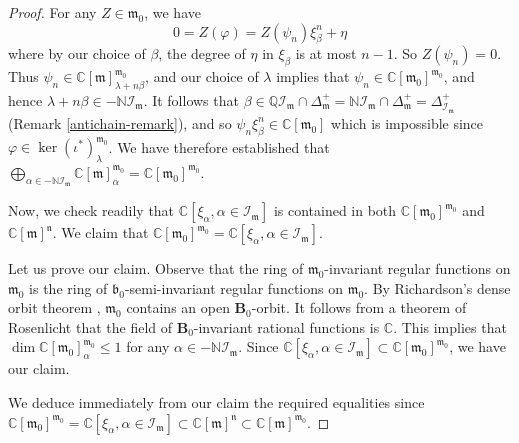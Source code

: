 \documentclass[10pt,a4paper]{amsart}
\newcommand{\soc}[1]{\mathcal{I}_{#1}}
\newcommand{\group}[1]{\mathbf{#1}}
\numberwithin{equation}{section}
\theoremstyle{plain}
\theoremstyle{definition}
\theoremstyle{remark}
\begin{document}
\begin{proof}
For any $Z \in \mathfrak{m}_{0}$, we have
$$
0 = Z ( \varphi )  = Z ( \psi_{n}) \xi_{\beta}^{n} + \eta
$$
where by our choice of $\beta$, the degree of $\eta$ in $\xi_{\beta}$ is at most $n-1$. 
So $Z (\psi_{n} ) = 0$.
Thus $\psi_{n} \in \mathbb{C}[\mathfrak{m}]^{\mathfrak{m}_{0}}_{\lambda + n\beta}$, and our choice
of $\lambda$ implies that $\psi_{n} \in \mathbb{C}[\mathfrak{m}_{0}]^{\mathfrak{m}_{0}}$, and hence
$\lambda + n\beta \in -\mathbb{N}\soc{\mathfrak{m}}$. 
It follows that 
$\beta \in \mathbb{Q} \soc{\mathfrak{m}}\cap \Delta_{\mathfrak{m}}^{+} = 
\mathbb{N}\soc{\mathfrak{m}}\cap \Delta_{\mathfrak{m}}^{+} = \Delta_{\soc{\mathfrak{m}}}^{+}$
(Remark \ref{antichain-remark}), and 
so $\psi_{n}\xi_{\beta}^{n}\in \mathbb{C}[\mathfrak{m}_{0}]$
which is impossible since $\varphi \in \ker (\iota^{*})^{\mathfrak{m}_{0}}_{\lambda}$. 
We have therefore established that
$\bigoplus_{\alpha\in -\mathbb{N}\soc{\mathfrak{m}}} 
\mathbb{C} [\mathfrak{m}]_{\alpha}^{\mathfrak{m}_{0}} = 
\mathbb{C}[\mathfrak{m}_{0}]^{\mathfrak{m}_{0}}$. 

Now, we check readily that 
$\mathbb{C}[\xi_{\alpha} , \alpha \in \soc{\mathfrak{m}}]$ is contained in both 
$\mathbb{C}[\mathfrak{m}_{0}]^{\mathfrak{m}_{0}}$ and 
$\mathbb{C}[\mathfrak{m}]^{\mathfrak{n}}$.
We claim that 
$\mathbb{C}[\mathfrak{m}_{0}]^{\mathfrak{m}_{0}} = \mathbb{C}[\xi_{\alpha} , \alpha \in \soc{\mathfrak{m}}]$.

Let us prove our claim. Observe that the ring of $\mathfrak{m}_{0}$-invariant regular functions on 
$\mathfrak{m}_{0}$ is the ring of $\mathfrak{b}_{0}$-semi-invariant regular functions on $\mathfrak{m}_{0}$.
By Richardson's dense orbit theorem \cite{R}, $\mathfrak{m}_{0}$ contains an open $\group{B}_{0}$-orbit. 
It follows from a theorem of Rosenlicht \cite{Ro} that the field of $\group{B}_{0}$-invariant rational functions 
is $\mathbb{C}$. This implies that $\dim \mathbb{C}[\mathfrak{m}_{0}]^{\mathfrak{m}_{0}}_{\alpha} \leqslant 1$
for any $\alpha \in -\mathbb{N}\soc{\mathfrak{m}}$. Since  
$\mathbb{C}[\xi_{\alpha} , \alpha \in \soc{\mathfrak{m}}] \subset 
\mathbb{C}[\mathfrak{m}_{0}]^{\mathfrak{m}_{0}}$,
we have our claim.

We deduce immediately from our claim the required equalities since 
$\mathbb{C}[\mathfrak{m}_{0}]^{\mathfrak{m}_{0}} = 
\mathbb{C}[\xi_{\alpha} , \alpha \in \soc{\mathfrak{m}}] 
\subset \mathbb{C}[\mathfrak{m}]^{\mathfrak{n}} \subset
\mathbb{C} [\mathfrak{m}]^{\mathfrak{m}_{0}}$. 
\end{proof}
\end{document}
